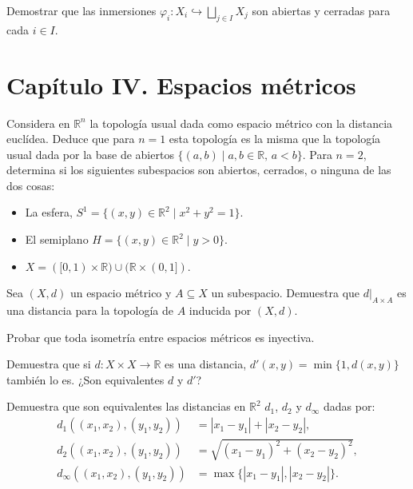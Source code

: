 \begin{ejer}[109]
Demostrar que las inmersiones $\varphi_i \colon X_i \hookrightarrow \bigsqcup_{j \in I} X_j$ son abiertas y cerradas para cada $i \in I$.
\end{ejer}

\section*{Capítulo IV. Espacios métricos}

\begin{ejer}[110]
Considera en $\mathbb{R}^n$ la topología usual dada como espacio métrico con la distancia euclídea. Deduce que para $n = 1$ esta topología es la misma que la topología usual dada por la base de abiertos $\{(a,b) \mid a,b \in \mathbb{R}, \, a < b\}$. Para $n = 2$, determina si los siguientes subespacios son abiertos, cerrados, o ninguna de las dos cosas:
\begin{itemize}
    \item La esfera, $S^1 = \{(x,y) \in \mathbb{R}^2 \mid x^2 + y^2 = 1\}$.
    \item El semiplano $H = \{(x,y) \in \mathbb{R}^2 \mid y > 0\}$.
    \item $X = ([0,1) \times \mathbb{R}) \cup (\mathbb{R} \times (0,1])$.
\end{itemize}
\end{ejer}

\begin{ejer}[111]
Sea $(X, d)$ un espacio métrico y $A \subseteq X$ un subespacio. Demuestra que $d|_{A \times A}$ es una distancia para la topología de $A$ inducida por $(X, d)$.
\end{ejer}

\begin{ejer}[112]
Probar que toda isometría entre espacios métricos es inyectiva.
\end{ejer}

\begin{ejer}[113]
Demuestra que si $d \colon X \times X \to \mathbb{R}$ es una distancia, $d'(x,y) = \min\{1, d(x,y)\}$ también lo es. ¿Son equivalentes $d$ y $d'$?
\end{ejer}

\begin{ejer}[114]
Demuestra que son equivalentes las distancias en $\mathbb{R}^2$ $d_1$, $d_2$ y $d_\infty$ dadas por:
\begin{align*}
    d_1((x_1, x_2), (y_1, y_2)) &= |x_1 - y_1| + |x_2 - y_2|, \\
    d_2((x_1, x_2), (y_1, y_2)) &= \sqrt{(x_1 - y_1)^2 + (x_2 - y_2)^2}, \\
    d_\infty((x_1, x_2), (y_1, y_2)) &= \max\{|x_1 - y_1|, |x_2 - y_2|\}.
\end{align*}
\end{ejer}

